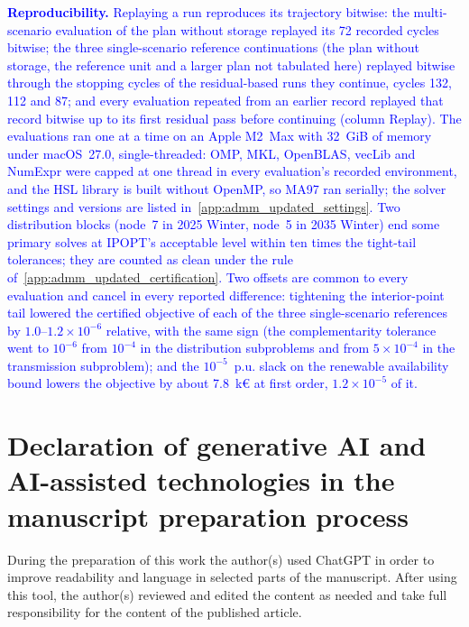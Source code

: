 \documentclass[preprint,12pt]{elsarticle}
\begin{document}
\textcolor{blue}{
    \textbf{Reproducibility.} Replaying a run reproduces its trajectory bitwise: the multi-scenario evaluation of the plan without storage replayed its 72 recorded cycles bitwise; the three single-scenario reference continuations (the plan without storage, the reference unit and a larger plan not tabulated here) replayed bitwise through the stopping cycles of the residual-based runs they continue, cycles 132, 112 and 87; and every evaluation repeated from an earlier record replayed that record bitwise up to its first residual pass before continuing (column Replay). The evaluations ran one at a time on an Apple M2~Max with 32~GiB of memory under macOS~27.0, single-threaded: OMP, MKL, OpenBLAS, vecLib and NumExpr were capped at one thread in every evaluation's recorded environment, and the HSL library is built without OpenMP, so MA97 ran serially; the solver settings and versions are listed in~\ref{app:admm_updated_settings}. Two distribution blocks (node~7 in 2025 Winter, node~5 in 2035 Winter) end some primary solves at IPOPT's acceptable level within ten times the tight-tail tolerances; they are counted as clean under the rule of~\ref{app:admm_updated_certification}. Two offsets are common to every evaluation and cancel in every reported difference: tightening the interior-point tail lowered the certified objective of each of the three single-scenario references by $1.0$--$1.2 \times 10^{-6}$ relative, with the same sign (the complementarity tolerance went to $10^{-6}$ from $10^{-4}$ in the distribution subproblems and from $5 \times 10^{-4}$ in the transmission subproblem); and the $10^{-5}$~p.u. slack on the renewable availability bound lowers the objective by about 7.8~k\euro{} at first order, $1.2 \times 10^{-5}$ of it.
}


\section*{Declaration of generative AI and AI-assisted technologies in the manuscript preparation process}

During the preparation of this work the author(s) used ChatGPT in order to improve readability and language in selected parts of the manuscript. After using this tool, the author(s) reviewed and edited the content as needed and take full responsibility for the content of the published article.

 

\end{document}
